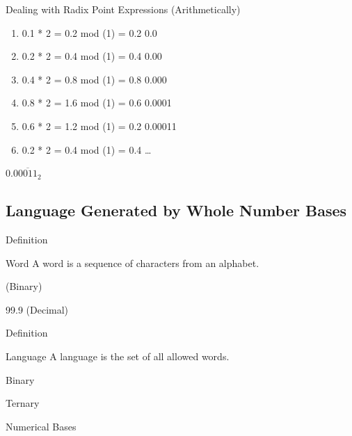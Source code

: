 \documentclass{beamer}
\begin{document}
\begin{frame}{Dealing with Radix Point Expressions (Arithmetically)}
  \begin{example}\pause
    \begin{enumerate}
      \item[] 0.1 * 2 = 0.2  mod (1) = 0.2 \hfill 0.0\pause
      \item[] 0.2 * 2 = 0.4  mod (1) = 0.4 \hfill 0.00\pause
      \item[] 0.4 * 2 = 0.8  mod (1) = 0.8 \hfill 0.000\pause
      \item[] 0.8 * 2 = 1.6  mod (1) = 0.6 \hfill 0.0001\pause
      \item[] 0.6 * 2 = 1.2  mod (1) = 0.2 \hfill 0.00011\pause
      \item[] 0.2 * 2 = 0.4  mod (1) = 0.4 \hfill\dots\pause
    \end{enumerate}
    \hfill $0.0\overline{0011}_2$
  \end{example}
\end{frame}















\subsection{Language Generated by Whole Number Bases}
\begin{frame}{Definition}
  \begin{block}{Word}
    A word is a sequence of characters from an alphabet.
  \end{block}\pause

  \begin{example}  (Binary) \pause

    99.9 (Decimal)
  \end{example}
\end{frame}

\begin{frame}{Definition}
  \begin{block}{Language}
    A language is the set of all allowed words.
  \end{block}\pause

  \begin{example}\pause
    Binary \pause

    Ternary \pause

    Numerical Bases
  \end{example}
\end{frame}
\end{document}
